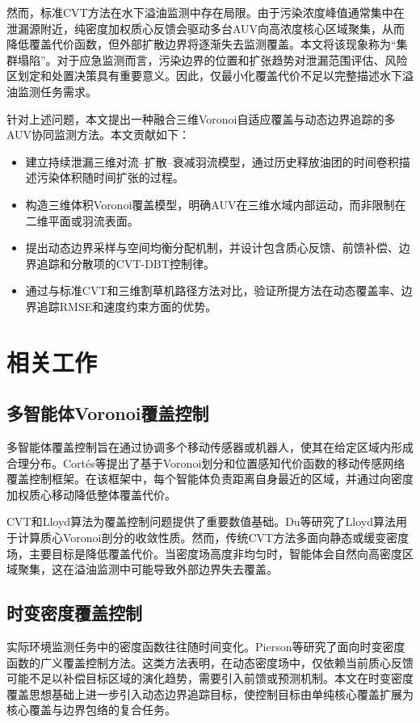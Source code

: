 \documentclass[conference]{IEEEtran}
\begin{document}
然而，标准CVT方法在水下溢油监测中存在局限。由于污染浓度峰值通常集中在泄漏源附近，纯密度加权质心反馈会驱动多台AUV向高浓度核心区域聚集，从而降低覆盖代价函数，但外部扩散边界将逐渐失去监测覆盖。本文将该现象称为“集群塌陷”。对于应急监测而言，污染边界的位置和扩张趋势对泄漏范围评估、风险区划定和处置决策具有重要意义。因此，仅最小化覆盖代价不足以完整描述水下溢油监测任务需求。

针对上述问题，本文提出一种融合三维Voronoi自适应覆盖与动态边界追踪的多AUV协同监测方法。本文贡献如下：
\begin{itemize}
\item 建立持续泄漏三维对流--扩散--衰减羽流模型，通过历史释放油团的时间卷积描述污染体积随时间扩张的过程。
\item 构造三维体积Voronoi覆盖模型，明确AUV在三维水域内部运动，而非限制在二维平面或羽流表面。
\item 提出动态边界采样与空间均衡分配机制，并设计包含质心反馈、前馈补偿、边界追踪和分散项的CVT-DBT控制律。
\item 通过与标准CVT和三维割草机路径方法对比，验证所提方法在动态覆盖率、边界追踪RMSE和速度约束方面的优势。
\end{itemize}

\section{相关工作}
\subsection{多智能体Voronoi覆盖控制}
多智能体覆盖控制旨在通过协调多个移动传感器或机器人，使其在给定区域内形成合理分布。Cortés等提出了基于Voronoi划分和位置感知代价函数的移动传感网络覆盖控制框架\cite{cortes2004coverage}。在该框架中，每个智能体负责距离自身最近的区域，并通过向密度加权质心移动降低整体覆盖代价。

CVT和Lloyd算法为覆盖控制问题提供了重要数值基础。Du等研究了Lloyd算法用于计算质心Voronoi剖分的收敛性质\cite{du2006lloyd}。然而，传统CVT方法多面向静态或缓变密度场，主要目标是降低覆盖代价。当密度场高度非均匀时，智能体会自然向高密度区域聚集，这在溢油监测中可能导致外部边界失去覆盖。

\subsection{时变密度覆盖控制}
实际环境监测任务中的密度函数往往随时间变化。Pierson等研究了面向时变密度函数的广义覆盖控制方法\cite{pierson2019generalized}。这类方法表明，在动态密度场中，仅依赖当前质心反馈可能不足以补偿目标区域的演化趋势，需要引入前馈或预测机制。本文在时变密度覆盖思想基础上进一步引入动态边界追踪目标，使控制目标由单纯核心覆盖扩展为核心覆盖与边界包络的复合任务。
\end{document}

